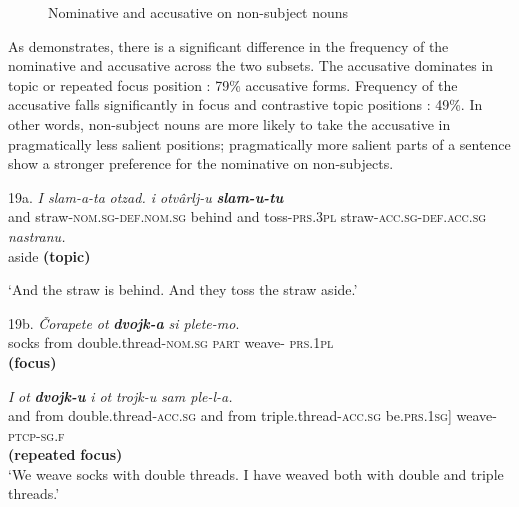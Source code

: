 \documentclass[output=paper]{langscibook}
\begin{document}
  
 

\begin{figure}
\caption{Nominative and accusative on non-subject nouns} 
\label{fig:key:7}
\end{figure}

As  demonstrates, there is a significant difference in the frequency of the nominative and accusative across the two subsets. The accusative dominates in topic  or repeated focus position : 79\% accusative forms. Frequency of the accusative falls significantly in focus  and contrastive topic positions : 49\%. In other words, non-subject nouns are more likely to take the accusative in pragmatically less salient positions; pragmatically more salient parts of a sentence show a stronger preference for the nominative on non-subjects.

19a.  \textit{I       slam-a-ta}   \textit{otzad.    i       otvârlj-u} \textbf{\textit{slam-u-tu}}   \\
        and  straw-\textsc{nom.sg-def.nom.sg}    behind  and   toss-\textsc{prs.3pl} straw-\textsc{acc.sg-def.acc.sg}\\
 \textit{nastranu.\\
}         aside                                                                                                  \textbf{(topic)}

‘And the straw is behind. And they toss the straw aside.’

19b. \textit{Čorapete  ot} \textbf{\textit{dvojk-a}} \textit{si   plete-mo}. \\
          socks  from    double.thread-\textsc{nom.sg}  \textsc{part}  weave- \textsc{prs.}1\textsc{pl}\\
                                         \textbf{(focus)}

         \textit{I}    \textit{ot}   \textbf{\textit{dvojk-u} }               \textit{i     ot}    \textit{trojk-u}                       \textit{sam               ple-l-a.}                 \\
        and from  double.thread-\textsc{acc.sg} and from   triple.thread-\textsc{acc.sg} be\textsc{.prs.}1\textsc{sg}] weave-\textsc{ptcp-sg.f}\\
                        \textbf{(repeated} \textbf{focus)}\\
       ‘We weave socks with double threads. I have weaved both with double and triple threads.’
\end{document}
